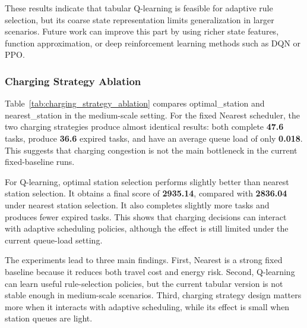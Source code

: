 These results indicate that tabular Q-learning is feasible for adaptive rule selection, but its coarse state representation limits generalization in larger scenarios. Future work can improve this part by using richer state features, function approximation, or deep reinforcement learning methods such as DQN or PPO.

\subsubsection{Charging Strategy Ablation}
\begin{table}[htbp]
    \centering
    \caption{Charging strategy ablation results on the medium-scale setting.}
    \label{tab:charging_strategy_ablation}
\end{table}

Table~\ref{tab:charging_strategy_ablation} compares optimal\_station and nearest\_station in the medium-scale setting. For the fixed Nearest scheduler, the two charging strategies produce almost identical results: both complete \textbf{47.6} tasks, produce \textbf{36.6} expired tasks, and have an average queue load of only \textbf{0.018}. This suggests that charging congestion is not the main bottleneck in the current fixed-baseline runs.

For Q-learning, optimal station selection performs slightly better than nearest station selection. It obtains a final score of \textbf{2935.14}, compared with \textbf{2836.04} under nearest station selection. It also completes slightly more tasks and produces fewer expired tasks. This shows that charging decisions can interact with adaptive scheduling policies, although the effect is still limited under the current queue-load setting.

The experiments lead to three main findings. First, Nearest is a strong fixed baseline because it reduces both travel cost and energy risk. Second, Q-learning can learn useful rule-selection policies, but the current tabular version is not stable enough in medium-scale scenarios. Third, charging strategy design matters more when it interacts with adaptive scheduling, while its effect is small when station queues are light.
